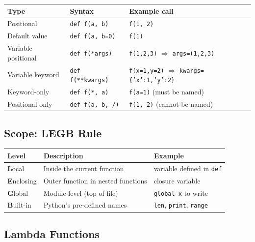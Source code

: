 \documentclass[oneside]{book}
\begin{document}
\begin{center}
\begin{tabularx}{\linewidth}{lXl}
\toprule
\textbf{Type} & \textbf{Syntax} & \textbf{Example call} \\
\midrule
Positional              & \texttt{def f(a, b)}          & \texttt{f(1, 2)} \\
Default value           & \texttt{def f(a, b=0)}        & \texttt{f(1)} \\
Variable positional     & \texttt{def f(*args)}         & \texttt{f(1,2,3)} $\Rightarrow$ \texttt{args=(1,2,3)} \\
Variable keyword        & \texttt{def f(**kwargs)}      & \texttt{f(x=1,y=2)} $\Rightarrow$ \texttt{kwargs=\{'x':1,'y':2\}} \\
Keyword-only            & \texttt{def f(*, a)}          & \texttt{f(a=1)} (must be named) \\
Positional-only         & \texttt{def f(a, b, /)}       & \texttt{f(1, 2)} (cannot be named) \\
\bottomrule
\end{tabularx}
\end{center}


\subsection*{Scope: LEGB Rule}

\begin{center}
\begin{tabularx}{\linewidth}{lXl}
\toprule
\textbf{Level} & \textbf{Description} & \textbf{Example} \\
\midrule
\textbf{L}ocal     & Inside the current function              & variable defined in \texttt{def} \\
\textbf{E}nclosing & Outer function in nested functions       & closure variable \\
\textbf{G}lobal    & Module-level (top of file)               & \texttt{global x} to write \\
\textbf{B}uilt-in  & Python's pre-defined names               & \texttt{len}, \texttt{print}, \texttt{range} \\
\bottomrule
\end{tabularx}
\end{center}

\subsection*{Lambda Functions}
\end{document}
